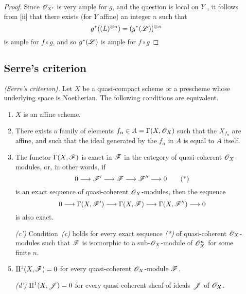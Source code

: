 \begin{proof}
\label{proof-2.5.1.12}
Since $\mathscr{O}_{X'}$ is very ample for $g$, and the question is local on $Y$ , it follows from [ii] that there exists (for $Y$ affine) an integer $n$ such that
\[
  g^*(\mathscr(L)^{\otimes n})=(g^*(\mathscr{L}))^{\otimes n}
\]
is ample for $f\circ g$, and so $g^*(\mathscr{L})$ is ample for $f\circ g$ 
\end{proof}

\subsection{Serre's criterion}
\label{subsection:serres-criterion}

\begin{thm}[5.2.1]
\label{2.5.2.1}
\emph{(Serre's criterion).}
Let $X$ be a quasi-compact scheme or a prescheme whose underlying space is Noetherian.
The following conditions are equivalent.
\begin{enumerate}[label=\emph{(\alph*)}]
  \item $X$ is an affine scheme.
  \item There exists a family of elements $f_\alpha\in A=\Gamma(X,\mathscr{O}_X)$ such that the $X_{f_\alpha}$ are affine, and such that the ideal generated by the $f_\alpha$ in $A$ is equal to $A$ itself.
  \item The functor $\Gamma(X,\mathscr{F})$ is exact in $\mathscr{F}$ in the category of quasi-coherent $\mathscr{O}_X$-modules, or, in other words, if
    \[
      0\to\sh{F}'\to\sh{F}\to\sh{F}''\to 0
      \tag{*}
    \]
    is an exact sequence of quasi-coherent $\mathscr{O}_X$-modules, then the sequence
    \[
     0\to\Gamma(X,\sh{F}')\to\Gamma(X,\sh{F})\to\Gamma(X,\sh{F}'')\to 0
    \]
    is also exact.
  \item[\emph{(c')}] Condition~\emph{(c)} holds for every exact sequence \emph{(*)} of quasi-coherent $\mathscr{O}_X$-modules such that $\mathscr{F}$ is isomorphic to a sub-$\mathscr{O}_X$-module of $\mathscr{O}_X^n$ for some finite $n$.
  \item $\mathrm{H}^1(X,\mathscr{F})=0$ for every quasi-coherent $\mathscr{O}_X$-module $\mathscr{F}$.
  \item[\emph{(d')}] $\mathrm{H}^1(X,\mathscr{J})=0$ for every quasi-coherent sheaf of ideals $\mathscr{J}$ of $\mathscr{O}_X$.
\end{enumerate}
\end{thm}

